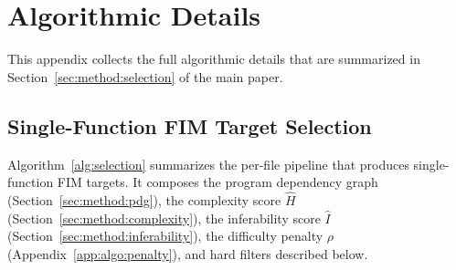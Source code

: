 %

\section{Algorithmic Details}
\label{app:algo}

This appendix collects the full algorithmic details that are summarized in
Section~\ref{sec:method:selection} of the main paper.

\subsection{Single-Function FIM Target Selection}
\label{app:algo:single}

Algorithm~\ref{alg:selection} summarizes the per-file pipeline that
produces single-function FIM targets. It composes the program dependency
graph (Section~\ref{sec:method:pdg}), the complexity score $\hat{H}$
(Section~\ref{sec:method:complexity}), the inferability score $\hat{I}$
(Section~\ref{sec:method:inferability}), the difficulty penalty $\rho$
(Appendix~\ref{app:algo:penalty}), and hard filters described below.

